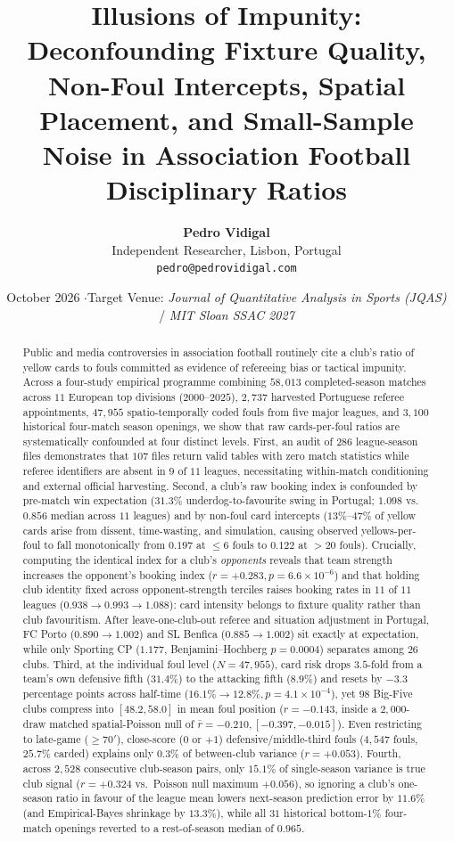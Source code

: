 \documentclass[10pt,twocolumn]{article}
\title{\vspace{-1.2em}\textbf{Illusions of Impunity: Deconfounding Fixture Quality, Non-Foul Intercepts, Spatial Placement, and Small-Sample Noise in Association Football Disciplinary Ratios}}
\author{
  \textbf{Pedro Vidigal}\\
  Independent Researcher, Lisbon, Portugal\\
  \texttt{pedro@pedrovidigal.com}
}
\date{October 2026 \quad$\cdot$\quad Target Venue: \textit{Journal of Quantitative Analysis in Sports (JQAS)} / \textit{MIT Sloan SSAC 2027}}
\begin{document}
\maketitle

\begin{abstract}
Public and media controversies in association football routinely cite a club's ratio of yellow cards to fouls committed as evidence of refereeing bias or tactical impunity. Across a four-study empirical programme combining $58,013$ completed-season matches across $11$ European top divisions ($2000\text{--}2025$), $2,737$ harvested Portuguese referee appointments, $47,955$ spatio-temporally coded fouls from five major leagues, and $3,100$ historical four-match season openings, we show that raw cards-per-foul ratios are systematically confounded at four distinct levels. First, an audit of $286$ league-season files demonstrates that $107$ files return valid tables with zero match statistics while referee identifiers are absent in $9$ of $11$ leagues, necessitating within-match conditioning and external official harvesting. Second, a club's raw booking index is confounded by pre-match win expectation ($31.3\%$ underdog-to-favourite swing in Portugal; $1.098$ vs.\ $0.856$ median across $11$ leagues) and by non-foul card intercepts ($13\%\text{--}47\%$ of yellow cards arise from dissent, time-wasting, and simulation, causing observed yellows-per-foul to fall monotonically from $0.197$ at $\le 6$ fouls to $0.122$ at $>20$ fouls). Crucially, computing the identical index for a club's \emph{opponents} reveals that team strength increases the opponent's booking index ($r = +0.283, p = 6.6\times 10^{-6}$) and that holding club identity fixed across opponent-strength terciles raises booking rates in $11$ of $11$ leagues ($0.938 \to 0.993 \to 1.088$): card intensity belongs to fixture quality rather than club favouritism. After leave-one-club-out referee and situation adjustment in Portugal, FC Porto ($0.890 \to 1.002$) and SL Benfica ($0.885 \to 1.002$) sit exactly at expectation, while only Sporting CP ($1.177$, Benjamini--Hochberg $p = 0.0004$) separates among $26$ clubs. Third, at the individual foul level ($N = 47,955$), card risk drops $3.5$-fold from a team's own defensive fifth ($31.4\%$) to the attacking fifth ($8.9\%$) and resets by $-3.3$ percentage points across half-time ($16.1\% \to 12.8\%, p = 4.1\times 10^{-4}$), yet $98$ Big-Five clubs compress into $[48.2, 58.0]$ in mean foul position ($r = -0.143$, inside a $2,000$-draw matched spatial-Poisson null of $\bar{r} = -0.210, [-0.397, -0.015]$). Even restricting to late-game ($\ge 70'$), close-score ($0$ or $+1$) defensive/middle-third fouls ($4,547$ fouls, $25.7\%$ carded) explains only $0.3\%$ of between-club variance ($r = +0.053$). Fourth, across $2,528$ consecutive club-season pairs, only $15.1\%$ of single-season variance is true club signal ($r = +0.324$ vs.\ Poisson null maximum $+0.056$), so ignoring a club's one-season ratio in favour of the league mean lowers next-season prediction error by $11.6\%$ (and Empirical-Bayes shrinkage by $13.3\%$), while all $31$ historical bottom-$1\%$ four-match openings reverted to a rest-of-season median of $0.965$.
\end{abstract}
\end{document}
